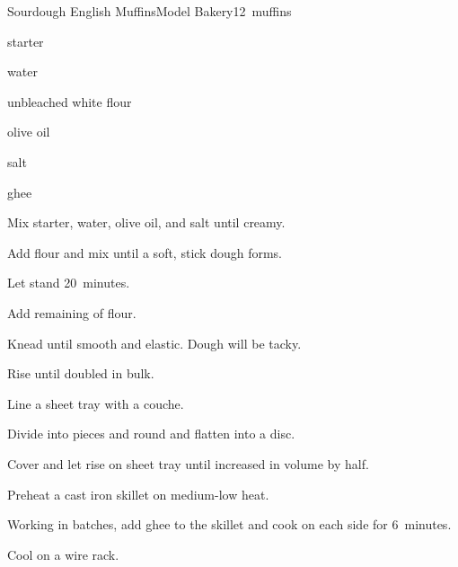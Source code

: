\begin{recipe}{Sourdough English Muffins}{Model Bakery}{12~muffins}

\begin{ingredients}
\item {} starter
\item {} water
\item {} unbleached white flour
\item {} olive oil
\item {} salt
\item ghee
\end{ingredients}

\begin{directions}
\item Mix starter, water, olive oil, and salt until creamy.
\item Add  flour and mix until a soft, stick dough forms.
\item Let stand 20~minutes.
\item Add remaining  of flour.
\item Knead until smooth and elastic. Dough will be tacky.
\item Rise until doubled in bulk.
\item Line a sheet tray with a couche.
\item Divide into  pieces and round and flatten into a disc.
\item Cover and let rise on sheet tray until increased in volume by half.
\item Preheat a cast iron skillet on medium-low heat.
\item Working in batches, add ghee to the skillet and cook on each side for 6~minutes.
\item Cool on a wire rack.
\end{directions}

\end{recipe}
